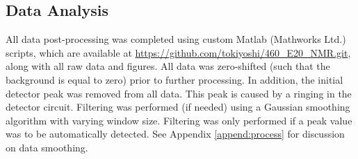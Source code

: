 \subsection{Data Analysis}
All data post-processing was completed using custom Matlab (Mathworks Ltd.) scripts, which are available at \url{https://github.com/tokiyoshi/460_E20_NMR.git}, along with all raw data and figures. All data was zero-shifted (such that the background is equal to zero) prior to further processing. In addition, the initial detector peak was removed from all data. This peak is caused by a ringing in the detector circuit. Filtering was performed (if needed) using a Gaussian smoothing algorithm with varying window size. Filtering was only performed if a peak value was to be automatically detected. See Appendix \ref{append:process} for discussion on data smoothing.